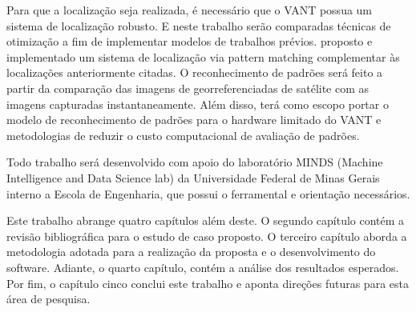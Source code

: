 Para que a localização seja realizada, é necessário que o VANT possua um sistema de localização robusto. E neste trabalho serão comparadas técnicas de otimização a fim de implementar modelos de trabalhos prévios.  proposto e implementado um sistema de localização via pattern matching complementar às localizações anteriormente citadas. O reconhecimento de padrões será feito a partir da comparação das imagens de georreferenciadas de satélite com as imagens capturadas instantaneamente. Além disso, terá como escopo portar o modelo de reconhecimento de padrões para o hardware limitado do VANT e metodologias de reduzir o custo computacional de avaliação de padrões.


Todo trabalho será desenvolvido com apoio do laboratório MINDS (Machine Intelligence and Data Science lab) da Universidade Federal de Minas Gerais interno a Escola de Engenharia, que possui o ferramental e orientação necessários.


Este trabalho abrange quatro capítulos além deste. O segundo capítulo contém a revisão bibliográfica para o estudo de caso proposto. O terceiro capítulo aborda a metodologia adotada para a realização da proposta e o desenvolvimento do software. Adiante, o quarto capítulo, contém a análise dos resultados esperados. Por fim, o capítulo cinco conclui este trabalho e aponta direções futuras para esta área de pesquisa.


